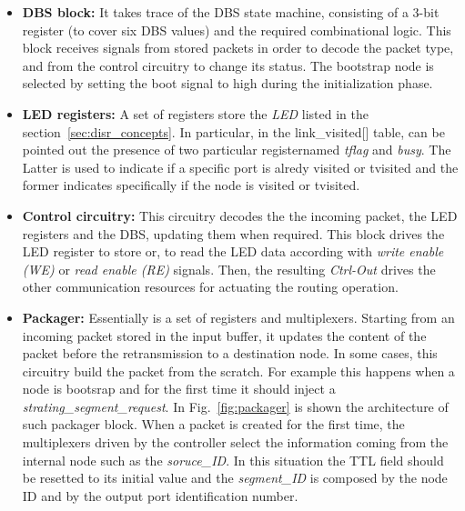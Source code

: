 \begin{itemize}

	\item \textbf{DBS block:} 
	It takes trace of the DBS state machine, 
	consisting of a 3-bit register (to cover six DBS values) and the 
	required combinational logic. This block receives signals from 
	stored packets  in order to decode the packet type, and from 
	the control circuitry to change its status.
	The bootstrap node is selected by setting the boot signal to high
	during the initialization phase. 

	\item \textbf{LED registers:} 
	A set of registers store the \emph{LED} listed in the
	section~\ref{sec:disr_concepts}.  In particular, in the
	link\_visited[] table, can be pointed out the presence of two  
	particular registernamed \emph{tflag} and \emph{busy}.  The Latter
	is used to indicate if a specific port is alredy visited or tvisited and
	the former indicates specifically if the node is visited or tvisited.

    \item \textbf{Control circuitry:}
    This circuitry decodes the the      incoming packet, the LED
	registers and the DBS,     updating them when required. This block
	drives the LED register   to store or, to read the LED data
	according with     \emph{write enable (WE)} or \emph{read enable (RE)}
	signals. Then, the resulting \emph{Ctrl-Out} drives the other
	communication resources for actuating the \disr{} routing operation.

	\item \textbf{Packager:}
	Essentially is a set of registers and multiplexers. Starting from
	an incoming packet stored in the input buffer, it updates the
	content of the packet before the retransmission to   a destination
	node.  In some cases, this circuitry build the packet from the
	scratch.  For example this happens when a node is bootsrap and for
	the first time it should inject a
	\emph{strating\_segment\_request}. In Fig.~\ref{fig:packager} is
	shown the architecture of such packager block. When a packet is
	created for the first time, the multiplexers driven by the
	controller select the information coming from the internal node
	such as the \emph{soruce\_ID}. In this situation the TTL field
	should be resetted to its initial value and the \emph{segment\_ID}
	is composed by the node ID and by the output port identification 
	number.

\end{itemize}

